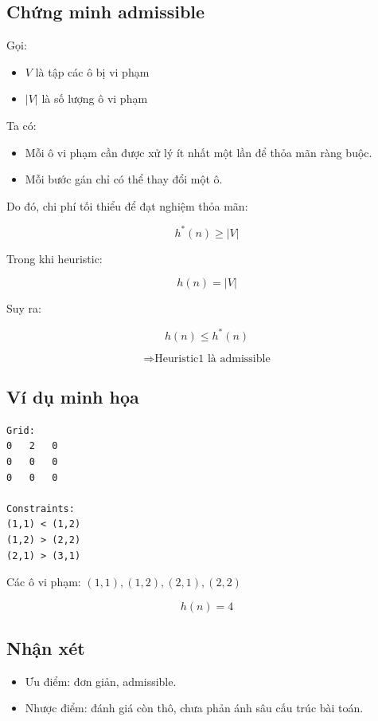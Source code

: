 \subsection{Chứng minh admissible}

Gọi:
\begin{itemize}
    \item $V$ là tập các ô bị vi phạm
    \item $|V|$ là số lượng ô vi phạm
\end{itemize}

Ta có:
\begin{itemize}
    \item Mỗi ô vi phạm cần được xử lý ít nhất một lần để thỏa mãn ràng buộc.
    \item Mỗi bước gán chỉ có thể thay đổi một ô.
\end{itemize}

Do đó, chi phí tối thiểu để đạt nghiệm thỏa mãn:

\[
h^*(n) \ge |V|
\]

\pagebreak
Trong khi heuristic:

\[
h(n) = |V|
\]

Suy ra:

\[
h(n) \le h^*(n)
\]

\[
\Rightarrow \text{Heuristic1 là admissible}
\]


\subsection{Ví dụ minh họa}

\begin{tcolorbox}[colback=gray!5, colframe=black, title=Ví dụ 3x3]
\begin{verbatim}
Grid:
0   2   0
0   0   0
0   0   0

Constraints:
(1,1) < (1,2)
(1,2) > (2,2)
(2,1) > (3,1)
\end{verbatim}
\end{tcolorbox}

Các ô vi phạm: $(1,1), (1,2), (2,1), (2,2)$

\[
h(n) = 4
\]

\subsection{Nhận xét}

\begin{itemize}
    \item Ưu điểm: đơn giản, admissible.
    \item Nhược điểm: đánh giá còn thô, chưa phản ánh sâu cấu trúc bài toán.
\end{itemize}

